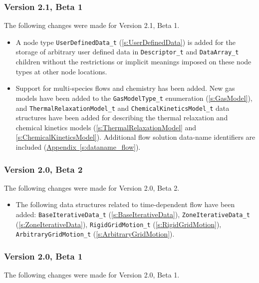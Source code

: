 \subsubsection{Version 2.1, Beta 1}
The following changes were made for Version 2.1, Beta 1.

\begin{itemize}
\item A node type
      \texttt{UserDefinedData\_t} (\autoref{s:UserDefinedData})
      is added for the storage of arbitrary user defined data in
      \texttt{Descriptor\_t} and \texttt{DataArray\_t} children without the
      restrictions or implicit meanings imposed on these node types at
      other node locations.
\item Support for multi-species flows and chemistry has been added.
      New gas models have been added to the \texttt{GasModelType\_t}
      enumeration (\autoref{s:GasModel}), and
      \texttt{ThermalRelaxationModel\_t} and \texttt{ChemicalKineticsModel\_t}
      data structures have been added for describing the
      thermal relaxation and chemical kinetics models
      (\autoref{s:ThermalRelaxationModel} and
      \autoref{s:ChemicalKineticsModel}).
      Additional flow solution data-name identifiers are included
      (\hyperref[s:dataname_flow]{Appendix~\ref*{s:dataname_flow}}).
\end{itemize}

\subsubsection{Version 2.0, Beta 2}
The following changes were made for Version 2.0, Beta 2.

\begin{itemize}
\item The following data structures related to time-dependent flow
      have been added:
      \texttt{BaseIterativeData\_t} (\autoref{s:BaseIterativeData}),
      \texttt{ZoneIterativeData\_t} (\autoref{s:ZoneIterativeData}),
      \texttt{RigidGridMotion\_t} (\autoref{s:RigidGridMotion}),
      \texttt{ArbitraryGridMotion\_t} (\autoref{s:ArbitraryGridMotion}).
\end{itemize}

\subsubsection{Version 2.0, Beta 1}
The following changes were made for Version 2.0, Beta 1.

